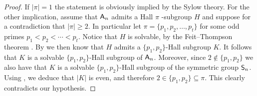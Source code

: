 \documentclass[12pt]{amsart}
\theoremstyle{definition}
\numberwithin{equation}{section}
\newcommand{\Al}{\textup{\textsf{A}}}
\newcommand{\Sy}{\textup{\textsf{S}}}
\begin{document}
\begin{proof}
If $|\pi|=1$ the statement is obviously implied by the Sylow theory.
For the other %
implication, assume that $\Al_n$ admits %
a Hall
$\pi$%
-subgroup $H$ and suppose for a contradiction that $|\pi|\geq
2$. %
In particular let %
$\pi=\{p_1,p_2,\ldots, p_t\}$ for some odd
primes $p_1<p_2<\cdots<p_t$. %
Notice that $H$ is solvable, by the Feit--Thompson theorem
\cite{Thompson63}. By \cite{Hall1} we then know that $H$ admits a
$\{p_1,p_2\}$-Hall subgroup $K$. It follows that $K$ %
is a solvable
$\{p_1,p_2\}$-Hall subgroup of $\Al_n$. Moreover, %
since $2\notin
\{p_1,p_2\}$ we %
also have that $K$ is a solvable $\{p_1,p_2\}$-Hall
subgroup of the symmetric group $\Sy_n$. Using \cite[Theorem
A4]{Hall2}, we deduce that $|K|$ is even, and therefore $2\in
\{p_1,p_2\}\subseteq \pi$. %
This clearly contradicts %
our hypothesis.
%
%
\end{proof}
\end{document}
